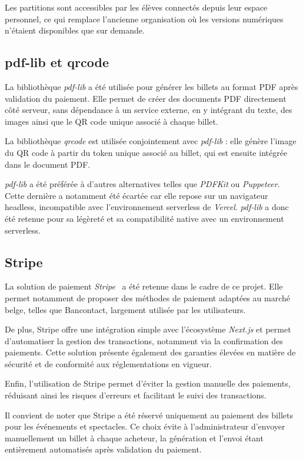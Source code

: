 \documentclass{article}
\begin{document}
Les partitions sont accessibles par les élèves connectés depuis leur 
espace personnel, ce qui remplace l'ancienne organisation où les versions 
numériques n'étaient disponibles que sur demande.

\subsection{pdf-lib et qrcode}

La bibliothèque \textit{pdf-lib} a été utilisée pour générer 
les billets au format PDF après validation du paiement. 
Elle permet de créer des documents PDF directement côté 
serveur, sans dépendance à un service externe, en y intégrant 
du texte, des images ainsi que le QR code unique associé 
à chaque billet.

La bibliothèque \textit{qrcode} est utilisée conjointement 
avec \textit{pdf-lib} : elle génère l'image du QR code à 
partir du token unique associé au billet, qui est ensuite 
intégrée dans le document PDF.

\textit{pdf-lib} a été préférée à d'autres alternatives 
telles que \textit{PDFKit} ou \textit{Puppeteer}. Cette 
dernière a notamment été écartée car elle repose sur un 
navigateur headless, incompatible avec l'environnement 
serverless de \textit{Vercel}. \textit{pdf-lib} a donc 
été retenue pour sa légèreté et sa compatibilité native 
avec un environnement serverless.

\subsection{Stripe}

La solution de paiement \textit{Stripe}~\cite{stripe} a été retenue dans le cadre de ce projet. Elle permet notamment de proposer des méthodes de paiement adaptées au marché belge, telles que Bancontact, largement utilisée par les utilisateurs.

De plus, Stripe offre une intégration simple avec l’écosystème \textit{Next.js} et permet d’automatiser la gestion des transactions, notamment via la confirmation des paiements. Cette solution présente également des garanties élevées en matière de sécurité et de conformité aux réglementations en vigueur.

Enfin, l’utilisation de Stripe permet d’éviter la gestion manuelle des paiements, réduisant ainsi les risques d’erreurs et facilitant le suivi des transactions.

Il convient de noter que Stripe a été réservé uniquement au paiement 
des billets pour les événements et spectacles. Ce choix évite à 
l'administrateur d'envoyer manuellement un billet à chaque acheteur, 
la génération et l'envoi étant entièrement automatisés après validation 
du paiement.
\end{document}
